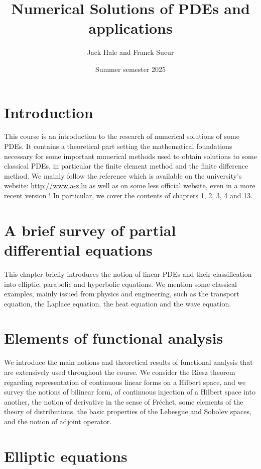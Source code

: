 \documentclass{article}
\title{Numerical Solutions of PDEs and applications}
\author{Jack Hale and Franck Sueur}
\date{Summer semester 2025}
\begin{document}
\maketitle

\section{Introduction}

This course is an introduction to the research of numerical solutions of some PDEs. 
It contains a theoretical part setting the mathematical foundations necessary for some important numerical methods used to obtain solutions to some classical PDEs, in particular the finite element method and the finite difference
method.
We mainly follow the reference \cite{Q} which is available on the university's website:  \url{http://www.a-z.lu} as well as on some less official website, even in a more recent version ! 
 In particular, we cover the contents of chapters 1, 2, 3, 4 and 13.





 \section{A brief survey of partial differential equations}

This chapter briefly introduces the notion of linear PDEs and their classification into elliptic, parabolic and hyperbolic  equations. We mention some classical examples, mainly issued from physics and engineering, such as the transport equation, the Laplace equation, the heat equation and the wave equation. 

\section{Elements of functional analysis} 

We introduce the main notions and theoretical results of functional analysis that are extensively used throughout the course. We consider the Riesz theorem regarding representation of continuous linear forms on a Hilbert space, and we survey the notions of bilinear form, of continuous injection of a Hilbert space into another, the notion of derivative in the sense of Fréchet, some elements of the theory of distributions, the basic properties of the Lebesgue and  Sobolev spaces, and the notion of adjoint operator. 

\section{Elliptic equations}
\end{document}
